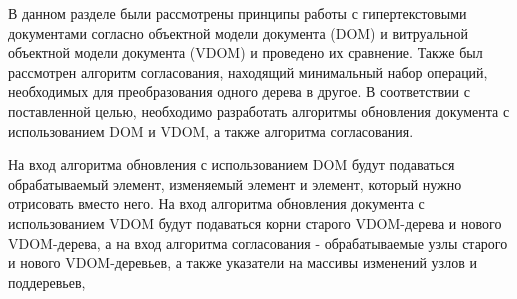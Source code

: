 В данном разделе были рассмотрены принципы работы с гипертекстовыми документами согласно объектной модели документа (DOM) и витруальной объектной модели документа (VDOM) и проведено их сравнение.
Также был рассмотрен алгоритм согласования, находящий минимальный набор операций, необходимых для преобразования одного дерева в другое.
В соответствии с поставленной целью, необходимо разработать алгоритмы обновления документа с использованием DOM и VDOM, а также алгоритма согласования.

На вход алгоритма обновления с использованием DOM будут подаваться обрабатываемый элемент, изменяемый элемент и элемент, который нужно отрисовать вместо него.
На вход алгоритма обновления документа с использованием VDOM будут подаваться корни старого VDOM-дерева и нового VDOM-дерева, а на вход алгоритма согласования - обрабатываемые узлы старого и нового VDOM-деревьев, а также указатели на массивы изменений узлов и поддеревьев,